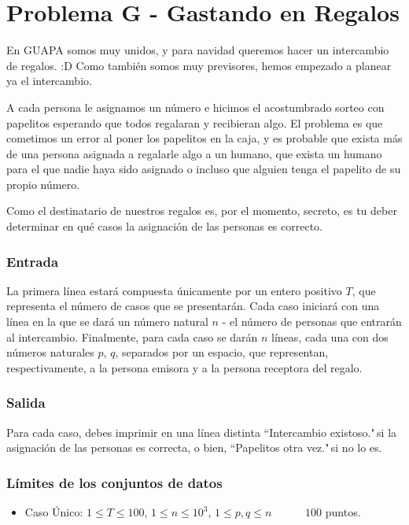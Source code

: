 \chapter*{Problema G - Gastando en Regalos}

En GUAPA somos muy unidos, y para navidad queremos hacer
un intercambio de regalos. :D Como también somos muy 
previsores, hemos empezado a planear ya el intercambio.

A cada persona le asignamos un número e hicimos el 
acostumbrado sorteo con papelitos esperando que todos 
regalaran y recibieran algo. El problema es que cometimos 
un error al poner los papelitos en la caja, y es probable
que exista más de una persona asignada a regalarle algo a 
un humano, que exista un humano para el que nadie haya 
sido asignado o incluso que alguien tenga el papelito de su 
propio número.

Como el destinatario de nuestros regalos es, por el
momento, secreto, es tu deber determinar en qué casos
la asignación de las personas es correcto.



\subsection*{Entrada}
La primera línea estará compuesta únicamente por un
entero positivo $T$, que representa el número de casos que
se presentarán. Cada caso iniciará con una línea en la que 
se dará un número natural $n$ - el número de personas que
entrarán al intercambio. Finalmente, para cada caso se
darán $n$ líneas, cada una con dos números naturales $p$,
$q$, separados por un espacio, que representan, 
respectivamente, a la persona emisora y a la persona
receptora del regalo.



\subsection*{Salida}
Para cada caso, debes imprimir en una línea distinta 
``Intercambio existoso."$\,$si la asignación de las 
personas es correcta, o bien, ``Papelitos otra vez."$\,$si
no lo es.



\subsection*{Límites de los conjuntos de datos}

\begin{itemize}
    \item Caso Único: $ 1 \leq T \leq 100 $, $ 1 \leq n 
    \leq 10^3 $, $ 1 \leq p, q \leq n$   $\quad \;\;\;\;\;$ $100$ puntos.
\end{itemize}



